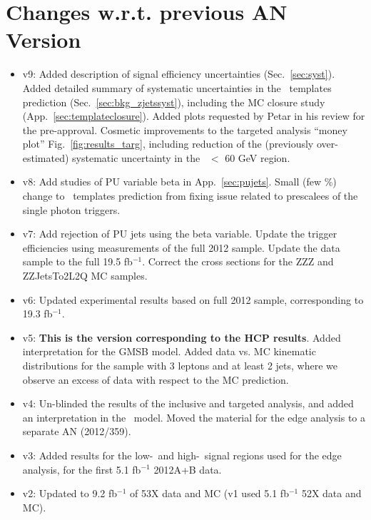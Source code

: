 \section{Changes w.r.t. previous AN Version}
\label{sec:changes}

\begin{itemize}

\item v9: Added description of signal efficiency uncertainties (Sec.~\ref{sec:syst}). 
Added detailed summary of systematic uncertainties in the \MET\ templates prediction (Sec.~\ref{sec:bkg_zjetssyst}), including the MC closure study (App.~\ref{sec:templateclosure}).
Added plots requested by Petar in his review for the pre-approval. Cosmetic improvements to the targeted analysis ``money plot'' Fig.~\ref{fig:results_targ}, including
reduction of the (previously over-estimated) systematic uncertainty in the \MET\ $<$ 60 GeV region.
\item v8: Add studies of PU variable beta in App.~\ref{sec:pujets}. Small (few \%) change to \MET\ templates prediction from fixing issue related to prescalees of the single photon triggers.
\item v7: Add rejection of PU jets using the beta variable. Update the trigger efficiencies using measurements of the full 2012 sample. Update the data sample to the full 19.5 fb$^{-1}$. Correct the cross sections for the ZZZ and ZZJetsTo2L2Q MC samples.
\item v6: Updated experimental results based on full 2012 sample, corresponding to 19.3 fb$^{-1}$.
\item v5: {\bf This is the version corresponding to the HCP results}. Added interpretation for the GMSB model. %
Added data vs. MC kinematic distributions for the sample with 3 leptons and at least 2 jets, where we observe an excess of data with respect to the MC prediction. %
\item v4: Un-blinded the results of the inclusive and targeted analysis, and added an interpretation in the \wzmet\ model. Moved the material for the edge analysis to a separate AN (2012/359).
\item v3: Added results for the low-\MET\ and high-\MET\ signal regions used for the edge analysis, for the first 5.1 fb$^{-1}$ 2012A+B data.
\item v2: Updated to 9.2 fb$^{-1}$ of 53X data and MC (v1 used 5.1 fb$^{-1}$ 52X data and MC).

\end{itemize}
